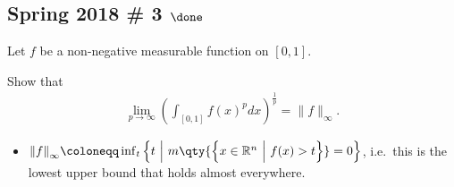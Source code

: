 \hypertarget{spring-2018-3-done}{%
\subsection{\texorpdfstring{Spring 2018 \# 3
\(\done\)}{Spring 2018 \# 3 \textbackslash done}}\label{spring-2018-3-done}}

Let \(f\) be a non-negative measurable function on \([0, 1]\).

Show that
\begin{align*}
\lim _{p \rightarrow \infty}\left(\int_{[0,1]} f(x)^{p} d x\right)^{\frac{1}{p}}=\|f\|_{\infty}.
\end{align*}

\begin{concept}

\envlist

\begin{itemize}
\tightlist
\item
  \({\left\lVert {f} \right\rVert}_\infty \coloneqq\inf_t {\left\{{ t{~\mathrel{\Big|}~}m\qty{\left\{{x\in {\mathbb{R}}^n {~\mathrel{\Big|}~}f(x) > t}\right\}} = 0 }\right\} }\),
  i.e.~this is the lowest upper bound that holds almost everywhere.
\end{itemize}

\end{concept}


